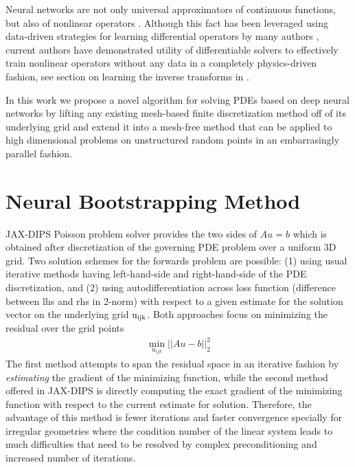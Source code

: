\documentclass{elsarticle}
\begin{document}
Neural networks are not only universal approximators of continuous functions, but also of nonlinear operators \cite{chen1995universal}. Although this fact has been leveraged using data-driven strategies for learning differential operators by many authors \cite{lu2019deeponet,bhattacharya2020model,li2020neural,li2020fourier}, current authors have demonstrated utility of differentiable solvers to effectively train nonlinear operators without any data in a completely physics-driven fashion, see section on learning the inverse transforms in \cite{pakravan2021solving}.


 




In this work we propose a novel algorithm for solving PDEs based on deep neural networks by lifting any existing mesh-based finite discretization method off of its underlying grid and extend it into a mesh-free method that can be applied to high dimensional problems on unstructured random points in an embarrasingly parallel fashion. 

\section{Neural Bootstrapping Method}

JAX-DIPS Poisson problem solver provides the two sides of $A u =b$ which is obtained after discretization of the governing PDE problem over a uniform 3D grid. Two solution schemes for the forwards problem are possible: (1) using usual iterative methods having left-hand-side and right-hand-side of the PDE discretization, and (2) using autodifferentiation across loss function (difference between lhs and rhs in 2-norm) with respect to a given estimate for the solution vector on the underlying grid $\rm u_{ijk}$. Both approaches focus on minimizing the residual over the grid points
\begin{align*}
	\min_{u_{ijk}} \vert\vert Au -b \vert \vert^2_2
\end{align*}
The first method attempts to span the residual space in an iterative fashion by \textit{estimating} the gradient of the minimizing function, while the second method offered in JAX-DIPS is directly computing the exact gradient of the minimizing function with respect to the current estimate for solution. Therefore, the advantage of this method is fewer iterations and faster convergence specially for irregular geometries where the condition number of the linear system leads to much difficulties that need to be resolved by complex preconditioning and increased number of iterations.
\end{document}
